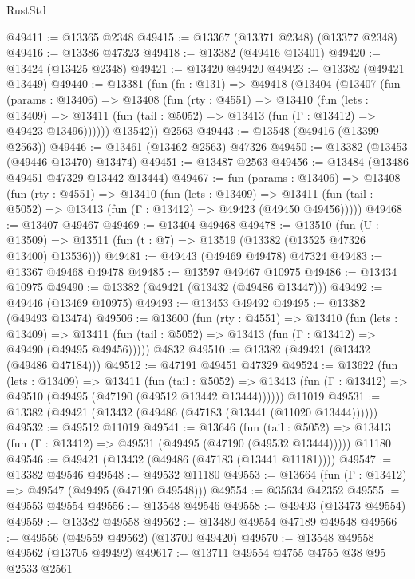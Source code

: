 \begin{lexlean}{RustStd}
\begin{coremodule}
@49411 := @13365 @2348
@49415 := @13367 (@13371 @2348) (@13377 @2348)
@49416 := @13386 @47323
@49418 := @13382 (@49416 @13401)
@49420 := @13424 (@13425 @2348)
@49421 := @13420 @49420
@49423 := @13382 (@49421 @13449)
@49440 := @13381
    (fun (fn : @131) =>
    @49418
      (@13404
        (@13407
          (fun (params : @13406) =>
          @13408
            (fun (rty : @4551) =>
            @13410
              (fun (lets : @13409) =>
              @13411 (fun (tail : @5052) => @13413 (fun (Γ : @13412) => @49423 @13496))))))
        @13542))
    @2563
@49443 := @13548 (@49416 (@13399 @2563))
@49446 := @13461 (@13462 @2563) @47326
@49450 := @13382 (@13453 (@49446 @13470) @13474)
@49451 := @13487 @2563
@49456 := @13484 (@13486 @49451 @47329 @13442 @13444)
@49467 := fun (params : @13406) =>
  @13408
    (fun (rty : @4551) =>
    @13410
      (fun (lets : @13409) =>
      @13411 (fun (tail : @5052) => @13413 (fun (Γ : @13412) => @49423 (@49450 @49456)))))
@49468 := @13407 @49467
@49469 := @13404 @49468
@49478 := @13510
    (fun (U : @13509) => @13511 (fun (t : @7) => @13519 (@13382 (@13525 @47326 @13400) @13536)))
@49481 := @49443 (@49469 @49478) @47324
@49483 := @13367 @49468 @49478
@49485 := @13597 @49467 @10975
@49486 := @13434 @10975
@49490 := @13382 (@49421 (@13432 (@49486 @13447)))
@49492 := @49446 (@13469 @10975)
@49493 := @13453 @49492
@49495 := @13382 (@49493 @13474)
@49506 := @13600
    (fun (rty : @4551) =>
    @13410
      (fun (lets : @13409) =>
      @13411 (fun (tail : @5052) => @13413 (fun (Γ : @13412) => @49490 (@49495 @49456)))))
    @4832
@49510 := @13382 (@49421 (@13432 (@49486 @47184)))
@49512 := @47191 @49451 @47329
@49524 := @13622
    (fun (lets : @13409) =>
    @13411
      (fun (tail : @5052) =>
      @13413 (fun (Γ : @13412) => @49510 (@49495 (@47190 (@49512 @13442 @13444))))))
    @11019
@49531 := @13382 (@49421 (@13432 (@49486 (@47183 (@13441 (@11020 @13444))))))
@49532 := @49512 @11019
@49541 := @13646
    (fun (tail : @5052) => @13413 (fun (Γ : @13412) => @49531 (@49495 (@47190 (@49532 @13444)))))
    @11180
@49546 := @49421 (@13432 (@49486 (@47183 (@13441 @11181))))
@49547 := @13382 @49546
@49548 := @49532 @11180
@49553 := @13664 (fun (Γ : @13412) => @49547 (@49495 (@47190 @49548)))
@49554 := @35634 @42352
@49555 := @49553 @49554
@49556 := @13548 @49546
@49558 := @49493 (@13473 @49554)
@49559 := @13382 @49558
@49562 := @13480 @49554 @47189 @49548
@49566 := @49556 (@49559 @49562) (@13700 @49420)
@49570 := @13548 @49558 @49562 (@13705 @49492)
@49617 := @13711
    @49554
    @4755
    @4755
    @38
    @95
    @2533
    @2561

\end{coremodule}
\end{lexlean}
